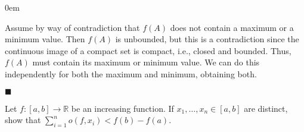 \documentclass[12pt]{article}
\renewcommand{\qed}{\hfill$\blacksquare$}
\renewenvironment{proof}{\begin{addmargin}[1em]{0em}\begin{newproof}}{\end{newproof}\end{addmargin}\qed}
\newenvironment{problem}[2][Problem]{\begin{trivlist}
\item[\hskip \labelsep {\bfseries #1}\hskip \labelsep {\bfseries #2.}]}{\end{trivlist}}
\begin{document}
\begin{proof}
Assume by way of contradiction that $f\left(A\right)$ does not contain a maximum or a minimum value. Then $f\left(A\right)$ is unbounded, but this is a contradiction since the continuous image of a compact set is compact, i.e., closed and bounded. Thus, $f\left(A\right)$ must contain its maximum or minimum value. We can do this independently for both the maximum and minimum, obtaining both.
\end{proof} 
 
 
 
 
\begin{problem}{1.30}
Let $f:\left[a,b\right]\rightarrow \mathbb{R}$ be an increasing function. If $x_1,\ldots,x_n \in \left[a,b\right]$ are distinct, show that $\sum_{i=1}^n o\left(f,x_i\right) < f\left(b\right)-f\left(a\right)$.
\end{problem}
\end{document}
